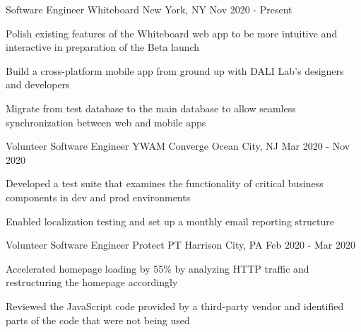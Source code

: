 

\begin{cventries}

\cventry
  {Software Engineer} %
  {Whiteboard} %
  {New York, NY} %
  {Nov 2020 - Present} %
  {
    \begin{cvitems} %
      \item {Polish existing features of the Whiteboard web app to be more intuitive and interactive in preparation of the Beta launch}
      \item {Build a cross-platform mobile app from ground up with DALI Lab's designers and developers}
      \item {Migrate from test database to the main database to allow seamless synchronization between web and mobile apps}
    \end{cvitems}
  }

\cventry
  {Volunteer Software Engineer} %
  {YWAM Converge} %
  {Ocean City, NJ} %
  {Mar 2020 - Nov 2020} %
  {
    \begin{cvitems} %
      \item {Developed a test suite that examines the functionality of critical business components in dev and prod environments}
      \item {Enabled localization testing and set up a monthly email reporting structure}
    \end{cvitems}
  }

\cventry
  {Volunteer Software Engineer} %
  {Protect PT} %
  {Harrison City, PA} %
  {Feb 2020 - Mar 2020} %
  {
    \begin{cvitems} %
      \item {Accelerated homepage loading by 55\% by analyzing HTTP traffic and restructuring the homepage accordingly}
      \item {Reviewed the JavaScript code provided by a third-party vendor and identified parts of the code that were not being used}
    \end{cvitems}
  }


\end{cventries}
